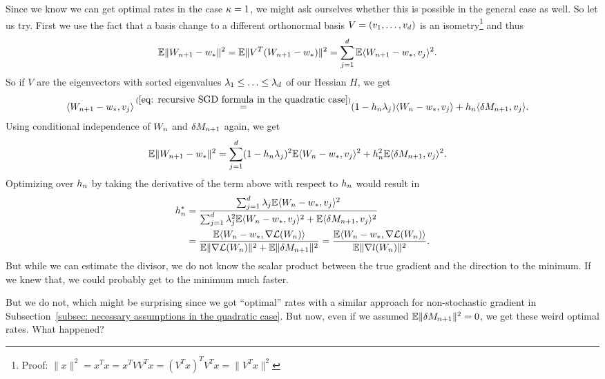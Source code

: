 Since we know we can get optimal rates in the case \(\kappa=1\), we might
ask ourselves whether this is possible in the general case as well. So let us
try. First we use the fact that a basis change to a different
orthonormal basis \(V=(v_1,\dots, v_d)\) is an isometry\footnote{
	Proof: \(\|x\|^2 = x^Tx = x^TVV^Tx = (V^T x)^T V^Tx = \|V^T x\|^2\)
}
and thus
\begin{align*}
	\mathbb{E}\|W_{n+1} - w_*\|^2
	&= \mathbb{E}\|V^T(W_{n+1} - w_*)\|^2
	= \sum_{j=1}^d \mathbb{E}\langle W_{n+1}-w_*, v_j\rangle^2.
\end{align*}
So if \(V\) are the eigenvectors with sorted eigenvalues
\(\lambda_1 \le \ldots\le\lambda_d\) of our Hessian \(H\), we get
\begin{align*}
	\langle \Weights_{n+1}-\minimum, v_j \rangle
	&\xeq{(\ref{eq: recursive SGD formula in the quadratic case})} (1-\lr_n\lambda_j)\langle\Weights_n-\minimum, v_j\rangle
	+ \lr_n\langle\martIncr_{n+1},v_j\rangle.
\end{align*}
Using conditional independence of \(W_n\) and \(\delta M_{n+1}\) again,
we get
\begin{align}
	\label{eq: expected square error in quadratic case}
	\mathbb{E}\|W_{n+1} - w_*\|^2
	&= \sum_{j=1}^d (1-h_n \lambda_j)^2
	\mathbb{E}\langle W_n-w_*, v_j\rangle^2
	+ h_n^2 \mathbb{E}\langle \delta M_{n+1}, v_j\rangle^2.
\end{align}
Optimizing over \(h_n\) by taking the derivative of the term above with
respect to \(h_n\) would result in
\begin{align*}
	h_n^* &= \frac{
		\sum_{j=1}^d \lambda_j \mathbb{E}\langle W_n-w_*, v_j\rangle^2
	}{
		\sum_{j=1}^d\lambda_j^2\mathbb{E}\langle W_n-w_*, v_j\rangle^2
		+ \mathbb{E}\langle\delta M_{n+1}, v_j\rangle^2
	}\\
	&= \frac{
		\mathbb{E}\langle W_n - w_*, \nabla\mathcal{L}(W_n)\rangle
	}{
		\mathbb{E}\|\nabla\mathcal{L}(W_n)\|^2 + \mathbb{E}\|\delta M_{n+1}\|^2
	}
	= \frac{
		\mathbb{E}\langle W_n - w_*, \nabla\mathcal{L}(W_n)\rangle
	}{
		\mathbb{E}\|\nabla l(W_n)\|^2
	}.
\end{align*}
But while we can estimate the divisor, we do not know the scalar product between
the true gradient and the direction to the minimum. If we knew that, we could
probably get to the minimum much faster.

But we do not, which might be surprising since we got ``optimal'' rates with
a similar approach for non-stochastic gradient in Subsection~\ref{subsec:
necessary assumptions in the quadratic case}. But now, even if we assumed
\(\mathbb{E}\|\delta M_{n+1}\|^2=0\), we get these weird optimal rates. What happened?

